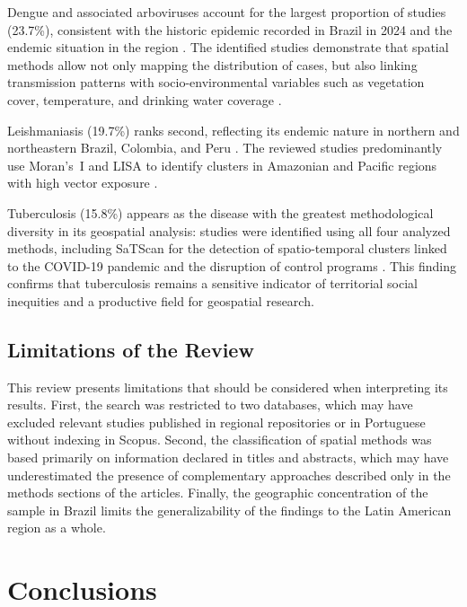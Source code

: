 \documentclass[runningheads]{llncs}
\begin{document}
Dengue and associated arboviruses account for the largest
proportion of studies (23.7\%), consistent with the historic
epidemic recorded in Brazil in 2024 and the endemic
situation in the region \cite{Sena2025}. The identified
studies demonstrate that spatial methods allow not only
mapping the distribution of cases, but also linking
transmission patterns with socio-environmental variables
such as vegetation cover, temperature, and drinking water
coverage \cite{Siqueira2021,DzulManzanilla2021}.

Leishmaniasis (19.7\%) ranks second, reflecting its endemic
nature in northern and northeastern Brazil, Colombia, and
Peru \cite{Miranda2024,Leishmaniasis2025}. The reviewed
studies predominantly use Moran's~I and LISA to identify
clusters in Amazonian and Pacific regions with high vector
exposure \cite{Konczycki2025,deSousa2024}.

Tuberculosis (15.8\%) appears as the disease with the
greatest methodological diversity in its geospatial analysis:
studies were identified using all four analyzed methods,
including SaTScan for the detection of spatio-temporal
clusters linked to the COVID-19 pandemic and the disruption
of control programs \cite{Souza2023,Perotto2025}. This
finding confirms that tuberculosis remains a sensitive
indicator of territorial social inequities and a productive
field for geospatial research.

\subsection{Limitations of the Review}

This review presents limitations that should be considered
when interpreting its results. First, the search was
restricted to two databases, which may have excluded relevant
studies published in regional repositories or in Portuguese
without indexing in Scopus. Second, the classification of
spatial methods was based primarily on information declared
in titles and abstracts, which may have underestimated the
presence of complementary approaches described only in the
methods sections of the articles. Finally, the geographic
concentration of the sample in Brazil limits the
generalizability of the findings to the Latin American
region as a whole.

\section{Conclusions}
\end{document}
